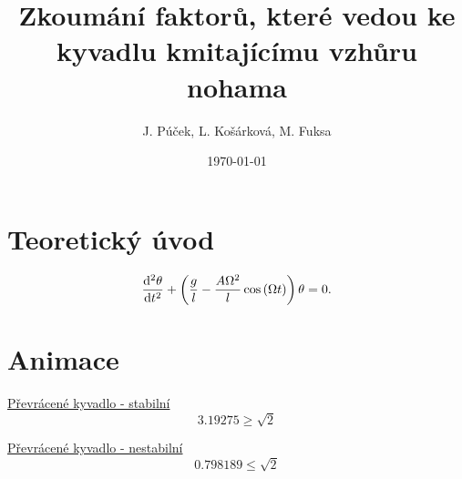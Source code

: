 \documentclass{beamer}
\title[Převrácené kyvadlo]{Zkoumání faktorů, které vedou ke kyvadlu kmitajícímu vzhůru nohama}
\author[J. P., L. K., M. F.]{J. Púček, L. Košárková, M. Fuksa}
\institute[Univerzita Karlova]{Univerzita Karlova, Česká republika}
\date{\today}
\begin{document}
\begin{frame}
\titlepage
\end{frame}

\section{Teoretický úvod}
\label{sec:uvod}

\begin{frame}
\begin{equation*}
  \label{eq:9}
  \frac{\mathrm{d}^2 {\theta}}{\mathrm{d} {t}^2}
  +
  \left(
    \frac{g}{l}
    -
    \frac{A \Omega^2}{l} \cos \left( \Omega t \right)
  \right)
  \theta
  =
  0
  .
\end{equation*}
\end{frame}

\section{Animace}
\label{sec:animace}

\begin{frame}
\begin{center}
\href{run:./animace.mp4}{Převrácené kyvadlo - stabilní}
\begin{equation*}
3.19275 \geq \sqrt{2}
\end{equation*}
\end{center}
\end{frame}

\begin{frame}
\begin{center}
\href{run:./animace2.mp4}{Převrácené kyvadlo - nestabilní}
\begin{equation*}
0.798189 \leq \sqrt{2}
\end{equation*}
\end{center}
\end{frame}
\end{document}
